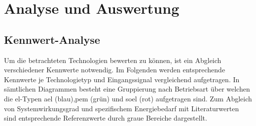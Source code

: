 \documentclass[onecolumn,10pt,titlepage]{article}
\begin{document}
\newpage
\section{Analyse und Auswertung}
\subsection{Kennwert-Analyse}
Um die betrachteten Technologien bewerten zu können, ist ein Abgleich verschiedener Kennwerte 
notwendig. Im Folgenden werden entsprechende Kennwerte je Technologietyp und Eingangssignal vergleichend aufgetragen. In sämtlichen Diagrammen besteht eine Gruppierung nach Betriebsart über welchen die \gls{el}-Typen \gls{ael} (blau),\gls{pem} (grün) und \gls{soel} (rot) aufgetragen sind. Zum Abgleich von Systemwirkungsgrad und spezifischem Energiebedarf mit Literaturwerten sind entsprechende Referenzwerte durch graue Bereiche dargestellt.
\end{document}
